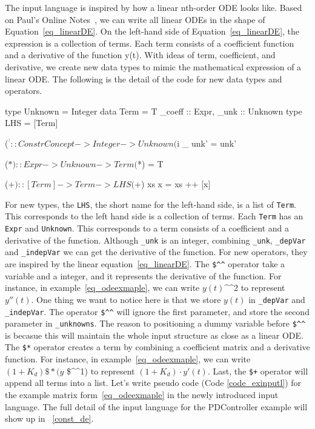 The input language is inspired by how a linear nth-order ODE looks like. Based on Paul's Online Notes~\citep{paullinearode}, we can write all linear ODEs in the shape of Equation~\ref{eq_linearDE}. On the left-hand side of Equation~\ref{eq_linearDE}, the expression is a collection of terms. Each term consists of a coefficient function and a derivative of the function y(t). With ideas of term, coefficient, and derivative, we create new data types to mimic the mathematical expression of a linear ODE. The following is the detail of the code for new data types and operators.

\begin{haskell1}
type Unknown = Integer
data Term = T{
	_coeff :: Expr,
	_unk :: Unknown
}
type LHS = [Term]

($^^) :: ConstrConcept -> Integer -> Unknown
($^^) _ unk' = unk'

($*) :: Expr -> Unknown -> Term
($*) = T

($+) :: [Term] -> Term -> LHS
($+) xs x  = xs ++ [x]
\end{haskell1}

For new types, the \verb|LHS|, the short name for the left-hand side, is a list of \verb|Term|. This corresponds to the left hand side is a collection of terms. Each \verb|Term| has an \verb|Expr| and \verb|Unknown|. This corresponds to a term consists of a coefficient and a derivative of the function. Although \verb|_unk| is an integer, combining \verb|_unk|, \verb|_depVar| and \verb|_indepVar| we can get the derivative of the function. For new operators, they are inspired by the linear equation~\ref{eq_linearDE}. The \verb|$^^| operator take a variable and a integer, and it represents the derivative of the function. For instance, in example~\ref{eq_odeexmaple}, we can write $y(t)$\^{}\^{}2 to represent $y''(t)$. One thing we want to notice here is that we store $y(t)$ in \verb|_depVar| and \verb|_indepVar|. The operator \verb|$^^| will ignore the first parameter, and store the second parameter in \verb|_unknowns|. The reason to positioning a dummy variable before \verb|$^^| is becasue this will maintain the whole input structure as close as a linear ODE. The \verb|$*| operator creates a term by combining a coefficient matrix and a derivative function. For instance, in example~\ref{eq_odeexmaple}, we can write $(1 + K_d) \$* (y$ \$\^{}\^{}1) to represent $(1 + K_d) \cdot y'(t)$. Last, the \verb|$+| operator will append all terms into a list. Let's write pseudo code (Code \ref{code_exinputl}) for the example matrix form~\ref{eq_odeexmaple} in the newly introduced input language. The full detail of the input language for the PDController example will show up in ~\ref{const_de}.

